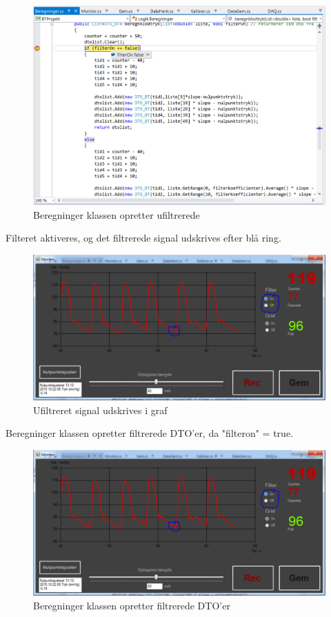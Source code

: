\begin{figure}[H]
	\centering
	\includegraphics[width=1\textwidth]{Figurer/Test_Aktiver_2}
	\caption{Beregninger klassen opretter ufiltrerede}
\end{figure}

Filteret aktiveres, og det filtrerede signal udskrives efter blå ring.

\begin{figure}[H]
	\centering
	\includegraphics[width=1\textwidth]{Figurer/Test_Aktiver_3}
	\caption{Ufiltreret signal udskrives i graf}
\end{figure}

Beregninger klassen opretter filtrerede DTO'er, da "filteron" = true.

\begin{figure}[H]
	\centering
	\includegraphics[width=1\textwidth]{Figurer/Test_Aktiver_3}
	\caption{Beregninger klassen opretter filtrerede DTO'er}
\end{figure}

